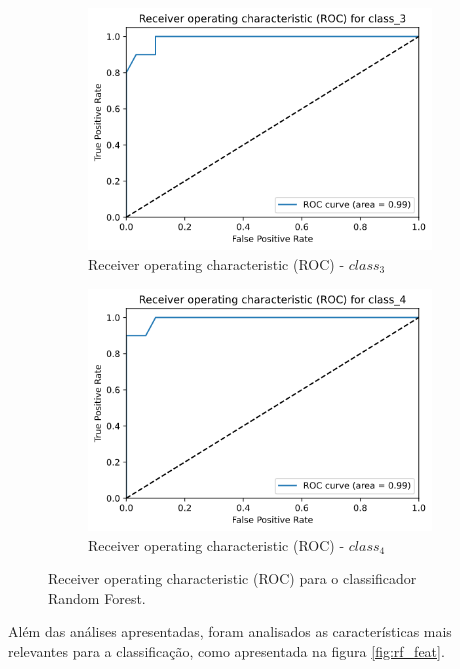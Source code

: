 \documentclass[
	article,			%
	11pt,				%
	oneside,			%
	a4paper,			%
	english,			%
	brazil,				%
	sumario=tradicional
	]{abntex2}
\begin{document}
\begin{figure}
\begin{subfigure}[b]{0.475\textwidth}
    \includegraphics[scale=0.375]{fig/rf_roc3.png}
    \caption{Receiver operating characteristic (ROC) - $class_3$}
    \label{fig:rf_roc3}
    \end{subfigure}
    \hfill
    \begin{subfigure}[b]{0.475\textwidth}
    \centering
    \includegraphics[scale=0.375]{fig/rf_roc4.png}
    \caption{Receiver operating characteristic (ROC) - $class_4$}
    \label{fig:rf_roc4}
    \end{subfigure}
    \caption{Receiver operating characteristic (ROC) para o classificador Random Forest.}
    \label{rf_roc}
\end{figure}

Além das análises apresentadas, foram analisados as características mais relevantes para a classificação, como apresentada na figura \ref{fig:rf_feat}.
\end{document}

